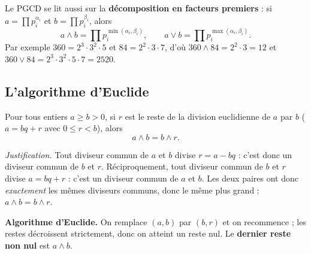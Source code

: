\begin{remarque}
Le PGCD se lit aussi sur la \textbf{décomposition en facteurs premiers} : si
$a=\prod p_i^{\alpha_i}$ et $b=\prod p_i^{\beta_i}$, alors
\[
a\wedge b=\prod p_i^{\min(\alpha_i,\beta_i)},\qquad
a\vee b=\prod p_i^{\max(\alpha_i,\beta_i)}.
\]
Par exemple $360=2^3\cdot3^2\cdot5$ et $84=2^2\cdot3\cdot7$, d'où
$360\wedge84=2^2\cdot3=12$ et $360\vee84=2^3\cdot3^2\cdot5\cdot7=2520$.
\end{remarque}

\subsection{L'algorithme d'Euclide}

\begin{theoreme}
Pour tous entiers $a\ge b>0$, si $r$ est le reste de la division euclidienne de $a$ par $b$
($a=bq+r$ avec $0\le r<b$), alors
\[
a\wedge b=b\wedge r.
\]
\end{theoreme}

\begin{remarque}
\textit{Justification.} Tout diviseur commun de $a$ et $b$ divise $r=a-bq$ : c'est donc un
diviseur commun de $b$ et $r$. Réciproquement, tout diviseur commun de $b$ et $r$ divise
$a=bq+r$ : c'est un diviseur commun de $a$ et $b$. Les deux paires ont donc \emph{exactement}
les mêmes diviseurs communs, donc le même plus grand : $a\wedge b=b\wedge r$.
\end{remarque}

\begin{aretenir}
\textbf{Algorithme d'Euclide.} On remplace $(a,b)$ par $(b,r)$ et on recommence ; les restes
décroissent strictement, donc on atteint un reste nul. Le \textbf{dernier reste non nul} est
$a\wedge b$.
\end{aretenir}

\begin{illus}
\end{illus}

